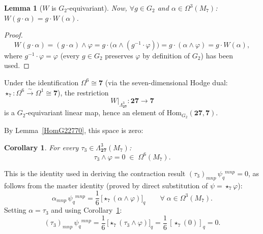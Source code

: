 \documentclass[a4paper,11pt,fleqn]{article}
\theoremstyle{plain}
\newtheorem{lemma}[theorem]{Lemma}
\newtheorem{corollary}[theorem]{Corollary}
\theoremstyle{definition}
\newcommand{\HomG}{\mathrm{Hom}_{G_2}}
\begin{document}
\begin{lemma}[$W$ is $G_2$-equivariant]
Now, $\forall g\in G_2$ and $\alpha\in\Omega^3(M_7)$:
$W(g\cdot\alpha)=g\cdot W(\alpha)$.
\end{lemma}
\begin{proof}
\[
  W(g\cdot\alpha)
  =(g\cdot\alpha)\wedge\varphi
  =g\cdot\!\bigl(\alpha\wedge(g^{-1}\cdot\varphi)\bigr)
  =g\cdot(\alpha\wedge\varphi)
  =g\cdot W(\alpha),
\]
where $g^{-1}\cdot\varphi=\varphi$ (every $g\in G_2$ preserves $\varphi$
by definition of $G_2$) has been used.
\end{proof}

\noindent
Under the identification $\Omega^6\cong\mathbf{7}$
(via the seven-dimensional Hodge dual: $\star_7:\Omega^6\xrightarrow{\sim}\Omega^1\cong\mathbf{7}$),
the restriction
\[
  W\big|_{\Lambda^3_{\mathbf{27}}}:
  \mathbf{27}\longrightarrow\mathbf{7}
\]
is a $G_2$-equivariant linear map, hence an element of
$\HomG(\mathbf{27},\mathbf{7})$.

By Lemma~\ref{HomG22770}, this space is zero:

\begin{corollary}\label{cor:main}
For every $\tau_3\in\Lambda^3_{\mathbf{27}}(M_7)$:
\[
  \tau_3\wedge\varphi = 0\;\in\;\Omega^6(M_7).
\]
\end{corollary}

\noindent
This is the identity used in deriving the contraction result
$(\tau_3)_{mnp}\,\psi_q{}^{mnp}=0$, as follows from the master identity
(proved by direct substitution of $\psi=\star_7\varphi$):
\[
  \alpha_{mnp}\,\psi_q{}^{mnp}
  =\frac{1}{6}\,\bigl[\star_7(\alpha\wedge\varphi)\bigr]_q
  \qquad\forall\;\alpha\in\Omega^3(M_7).
\]
Setting $\alpha=\tau_3$ and using Corollary~\ref{cor:main}:
\[
  (\tau_3)_{mnp}\,\psi_q{}^{mnp}
  =\frac{1}{6}\,\bigl[\star_7(\tau_3\wedge\varphi)\bigr]_q
  =\frac{1}{6}\,[\star_7(0)]_q
  = 0.
\]
\end{document}

